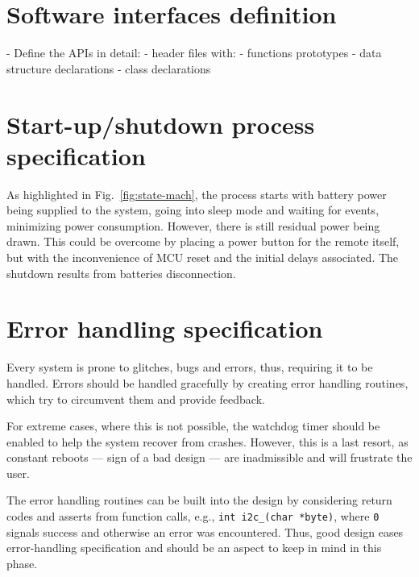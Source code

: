 \section{Software interfaces definition}
\label{sec:sw-interf-def}
- Define the APIs in detail:
  - header files with:
    - functions prototypes
    - data structure declarations
    - class declarations

\section{Start-up/shutdown process specification}
\label{sec:startup-shutdown}
As highlighted in Fig.~\ref{fig:state-mach}, the process starts with battery
power being supplied to the system, going into sleep mode and waiting for
events, minimizing power consumption. However, there is still residual power
being drawn. This could be overcome by placing a power button for the remote
itself, but with the inconvenience of MCU reset and the initial delays
associated. The shutdown results from batteries disconnection.
%
  \vspace{-5mm}
%  
\section{Error handling specification}
\label{sec:error-handling-specification}
Every system is prone to glitches, bugs and errors, thus, requiring it to be
handled. Errors should be handled gracefully by creating error handling
routines, which try to circumvent them and provide feedback.

For extreme cases, where this is not possible, the watchdog timer should be
enabled to help the system recover from crashes. However, this is a last resort,
as constant reboots --- sign of a bad design --- are inadmissible and will
frustrate the user.

The error handling routines can be built into the design by considering return
codes and asserts from function calls, e.g., \texttt{int i2c_\read(char *byte)},
where \texttt{0} signals success and otherwise an error was encountered. Thus,
good design eases error-handling specification and should be an aspect to keep
in mind in this phase.
%
  \vspace{-5mm}
